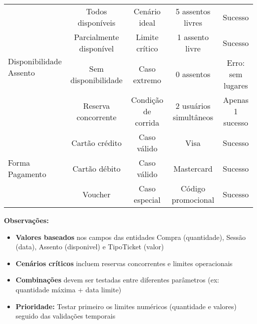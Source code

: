 \documentclass{article}
\begin{document}
\begin{table}[H]
{\begin{tabular}{|l|c|c|c|c|}
\multirow{4}{*}{Disponibilidade Assento} 
& Todos disponíveis & Cenário ideal & 5 assentos livres & Sucesso \\ \cline{2-5}
& Parcialmente disponível & Limite crítico & 1 assento livre & Sucesso \\ \cline{2-5}
& Sem disponibilidade & Caso extremo & 0 assentos & Erro: sem lugares \\ \cline{2-5}
& Reserva concorrente & Condição de corrida & 2 usuários simultâneos & Apenas 1 sucesso \\ \hline

\multirow{3}{*}{Forma Pagamento} 
& Cartão crédito & Caso válido & Visa & Sucesso \\ \cline{2-5}
& Cartão débito & Caso válido & Mastercard & Sucesso \\ \cline{2-5}
& Voucher & Caso especial & Código promocional & Sucesso \\ \hline

\end{tabular}%
}
\end{table}

\textbf{Observações:}
\begin{itemize}
\item \textbf{Valores baseados} nos campos das entidades Compra (quantidade), Sessão (data), Assento (disponivel) e TipoTicket (valor)
\item \textbf{Cenários críticos} incluem reservas concorrentes e limites operacionais
\item \textbf{Combinações} devem ser testadas entre diferentes parâmetros (ex: quantidade máxima + data limite)
\item \textbf{Prioridade:} Testar primeiro os limites numéricos (quantidade e valores) seguido das validações temporais
\end{itemize}
\end{document}

